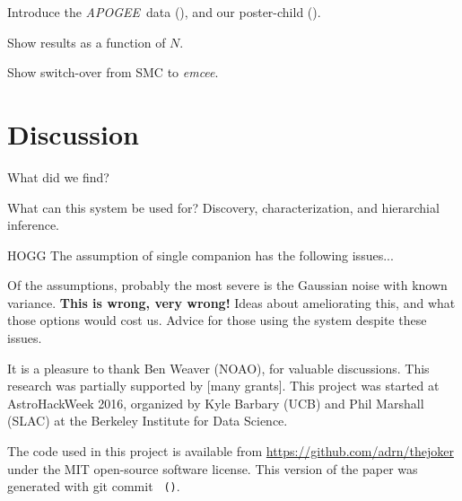 \documentclass[12pt, preprint]{aastex}
\newcommand{\project}[1]{\textsl{#1}}
\newcommand{\acronym}[1]{{\small{#1}}}
\newcommand{\apogee}{\project{\acronym{APOGEE}}}
\newcommand{\emcee}{\project{emcee}}
\begin{document}
Introduce the \apogee\ data
(\citealt{Majewski:2015,Holtzman:2015,Eisenstein:2011,Alam:2015}), and
our poster-child (\citealt{Troup:2016}).

Show results as a function of $N$.

Show switch-over from SMC to \emcee.

\section{Discussion}

What did we find?

What can this system be used for? Discovery, characterization, and
hierarchial inference.

HOGG The assumption of single companion has the following issues...

Of the assumptions, probably the most severe is the Gaussian noise
with known variance. \textbf{This is wrong, very wrong!} Ideas about
ameliorating this, and what those options would cost us. Advice for
those using the system despite these issues.

\acknowledgements
It is a pleasure to thank
  Ben Weaver (NOAO),
for valuable discussions.
This research was partially supported by [many grants].
This project was started at AstroHackWeek 2016, organized by Kyle
Barbary (UCB) and Phil Marshall (SLAC) at the Berkeley Institute for
Data Science.

The code used in this project is available from
\url{https://github.com/adrn/thejoker} under the MIT open-source
software license. This version of the paper was generated with git
commit \texttt{\githash~(\gitdate)}.



\end{document}
